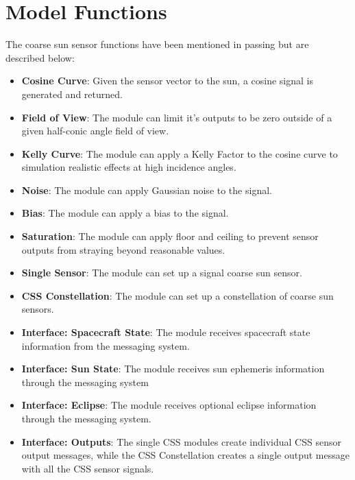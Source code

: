 
\section{Model Functions}
The coarse sun sensor functions have been mentioned in passing but are described below:
\begin{itemize}
	\item \textbf{Cosine Curve}: Given the sensor vector to the sun, a cosine signal is generated and returned.
	\item \textbf{Field of View}: The module can limit it's outputs to be zero outside of a given half-conic angle field of view.
	\item \textbf{Kelly Curve}: The module can apply a Kelly Factor to the cosine curve to simulation realistic effects at high incidence angles.
	\item \textbf{Noise}: The module can apply Gaussian noise to the signal.
	\item \textbf{Bias}: The module can apply a bias to the signal.
	\item \textbf{Saturation}: The module can apply floor and ceiling to prevent sensor outputs from straying beyond reasonable values.
	\item \textbf{Single Sensor}: The module can set up a signal coarse sun sensor.
	\item \textbf{CSS Constellation}: The module can set up a constellation of coarse sun sensors.
	\item \textbf{Interface: Spacecraft State}: The module receives spacecraft state information from the messaging system.
	\item \textbf{Interface: Sun State}: The module receives sun ephemeris information through the messaging system
	\item \textbf{Interface: Eclipse}: The module receives optional eclipse information through the messaging system.
	\item \textbf{Interface: Outputs}: The single CSS modules create individual CSS sensor output messages, while the CSS Constellation creates a single output message with all the CSS sensor signals.
\end{itemize}

